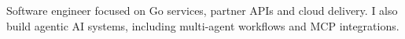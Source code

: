 %
%
%
\par{
Software engineer focused on Go services, partner APIs and cloud delivery. I also build agentic AI systems, including multi-agent workflows and MCP integrations.
}
